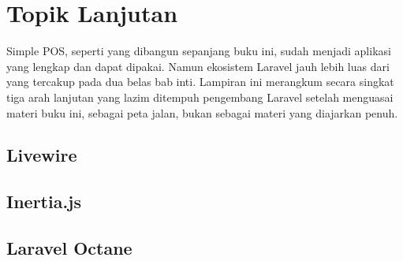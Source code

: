 
\chapter{Topik Lanjutan}
\label{app:topik-lanjutan}

Simple POS, seperti yang dibangun sepanjang buku ini, sudah menjadi aplikasi
yang lengkap dan dapat dipakai. Namun ekosistem Laravel jauh lebih luas dari
yang tercakup pada dua belas bab inti. Lampiran ini merangkum secara singkat
tiga arah lanjutan yang lazim ditempuh pengembang Laravel setelah menguasai
materi buku ini, sebagai peta jalan, bukan sebagai materi yang diajarkan
penuh.

\section{Livewire}


\section{Inertia.js}


\section{Laravel Octane}

